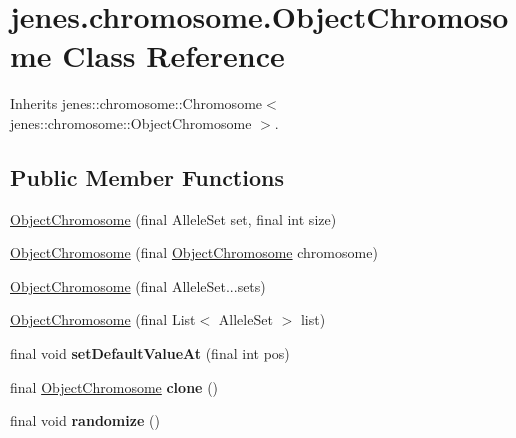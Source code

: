 \hypertarget{classjenes_1_1chromosome_1_1_object_chromosome}{
\section{jenes.chromosome.ObjectChromosome Class Reference}
\label{classjenes_1_1chromosome_1_1_object_chromosome}
}
Inherits jenes::chromosome::Chromosome$<$ jenes::chromosome::ObjectChromosome $>$.

\subsection*{Public Member Functions}
\begin{CompactItemize}
\item 
\hyperlink{classjenes_1_1chromosome_1_1_object_chromosome_5af7d34bc1f7260dca1dc5c38135f4a4}{ObjectChromosome} (final AlleleSet set, final int size)
\item 
\hyperlink{classjenes_1_1chromosome_1_1_object_chromosome_59e25d20fb54d53ff2b4adc53177d7d2}{ObjectChromosome} (final \hyperlink{classjenes_1_1chromosome_1_1_object_chromosome}{ObjectChromosome} chromosome)
\item 
\hyperlink{classjenes_1_1chromosome_1_1_object_chromosome_ba090ada4d0f24caaf6f68cfed7800f0}{ObjectChromosome} (final AlleleSet...sets)
\item 
\hyperlink{classjenes_1_1chromosome_1_1_object_chromosome_a6c8dcc77a9129f9634ea02f19d5a968}{ObjectChromosome} (final List$<$ AlleleSet $>$ list)
\item 
\hypertarget{classjenes_1_1chromosome_1_1_object_chromosome_d4b8a3ca38d15a8170b63464149b37aa}{
final void \textbf{setDefaultValueAt} (final int pos)}
\label{classjenes_1_1chromosome_1_1_object_chromosome_d4b8a3ca38d15a8170b63464149b37aa}

\item 
\hypertarget{classjenes_1_1chromosome_1_1_object_chromosome_4aa8eeaac6a20b30c260bfda00c78fe2}{
final \hyperlink{classjenes_1_1chromosome_1_1_object_chromosome}{ObjectChromosome} \textbf{clone} ()}
\label{classjenes_1_1chromosome_1_1_object_chromosome_4aa8eeaac6a20b30c260bfda00c78fe2}

\item 
\hypertarget{classjenes_1_1chromosome_1_1_object_chromosome_26a9d9d7eb049ff88c3321728fd9de07}{
final void \textbf{randomize} ()}
\label{classjenes_1_1chromosome_1_1_object_chromosome_26a9d9d7eb049ff88c3321728fd9de07}


\end{CompactItemize}
